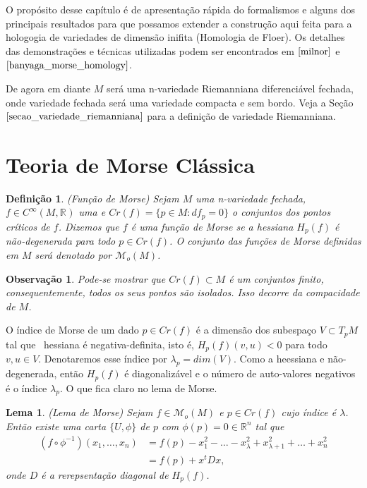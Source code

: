 \documentclass[12pt]{book}
\newtheorem{lema}[teorema]{Lema}
\newtheorem{definicao}[teorema]{Definição}
\newtheorem{observacao}[teorema]{Observação}
\newcommand{\funcoesmorse}[1]{\mathcal{M}_{o}(#1)}
\newcommand{\funcoessuaves}[1]{C^{\infty}(#1, \real{})}
\newcommand{\pontoscriticos}[1]{\textit{Cr}(#1)}
\newcommand{\real}[1]{\mathbb{R}^{#1}}
\begin{document}
	O propósito desse capítulo é de apresentação rápida do formalismos e alguns dos principais resultados para que possamos extender a construção aqui feita para a hologogia de variedades de dimensão inifita (Homologia de Floer). Os detalhes das demonstrações e técnicas utilizadas podem ser encontrados em $\cite{milnor}$ e $\cite{banyaga_morse_homology}$.
	
	De agora em diante $M$ será uma n-variedade Riemanniana diferenciável fechada, onde variedade fechada será uma variedade compacta e sem bordo. Veja a Seção $\ref{secao_variedade_riemanniana}$ para a definição de variedade Riemanniana.
	
	\section{Teoria de Morse Clássica}
	
	\begin{definicao}
		(Função de Morse) Sejam $M$ uma n-variedade fechada, $f \in \funcoessuaves{M}$ uma e $\pontoscriticos{f} = \{p \in M: df_{p} = 0\}$ o conjuntos dos pontos críticos de $f$. Dizemos que $f$ é uma função de Morse se a hessiana $H_{p}(f)$ é não-degenerada para todo $p \in \pontoscriticos{f}$. O conjunto das funções de Morse definidas em $M$ será denotado por $\funcoesmorse{M}$. 
	\end{definicao}
	
	\begin{observacao}
		Pode-se mostrar que $\pontoscriticos{f} \subset M$ é um conjuntos finito, consequentemente, todos os seus pontos são isolados. Isso decorre da compacidade de $M$.
	\end{observacao}
	
	O índice de Morse de um dado $p \in \pontoscriticos{f}$ é a dimensão dos subespaço $V\subset T_{p}M $ tal que \ hessiana é negativa-definita, isto é, $H_{p}(f)(v,u)<0$ para todo $v,u \in V$. Denotaremos esse índice por $\lambda_{p} = dim(V)$. Como a heessiana e não-degenerada, então $H_{p}(f)$ é diagonalizável e o número de auto-valores negativos é o índice $\lambda_{p}$. O que fica claro no lema de Morse.
	
	\begin{lema}
		(Lema de Morse) Sejam $f \in \funcoesmorse{M}$ e $p \in \pontoscriticos{f}$ cujo índice é $\lambda$. Então existe uma carta $\{U, \phi\}$ de $p$ com $\phi(p)=0 \in \real{n}$ tal que 
		$$
		\begin{aligned}
		(f\circ \phi^{-1})(x_{1}, \dots, x_{n}) &= f(p)-x_{1}^{2}-\dots -x^{2}_{\lambda}+x^{2}_{\lambda+1}+\dots + x^{2}_{n}
		\\
		&=f(p)+x^{t}Dx,
		\end{aligned}
		$$
		onde $D$ é a rerepsentação diagonal de $H_{p}(f)$.
	\end{lema}
	
\end{document}
